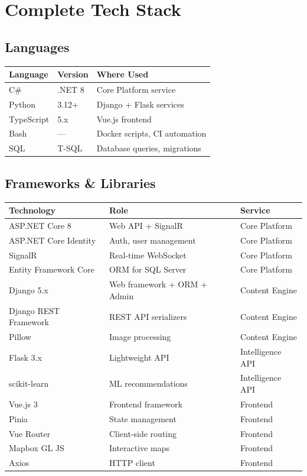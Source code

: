 \documentclass[12pt,letterpaper]{article}
\begin{document}
\newpage

\section{Complete Tech Stack}

\subsection{Languages}
\begin{tabular}{|l|l|l|}
\hline
\textbf{Language} & \textbf{Version} & \textbf{Where Used} \\
\hline
C\# & .NET 8 & Core Platform service \\
Python & 3.12+ & Django + Flask services \\
TypeScript & 5.x & Vue.js frontend \\
Bash & --- & Docker scripts, CI automation \\
SQL & T-SQL & Database queries, migrations \\
\hline
\end{tabular}

\subsection{Frameworks \& Libraries}
\begin{tabular}{|l|l|l|}
\hline
\textbf{Technology} & \textbf{Role} & \textbf{Service} \\
\hline
ASP.NET Core 8 & Web API + SignalR & Core Platform \\
ASP.NET Core Identity & Auth, user management & Core Platform \\
SignalR & Real-time WebSocket & Core Platform \\
Entity Framework Core & ORM for SQL Server & Core Platform \\
Django 5.x & Web framework + ORM + Admin & Content Engine \\
Django REST Framework & REST API serializers & Content Engine \\
Pillow & Image processing & Content Engine \\
Flask 3.x & Lightweight API & Intelligence API \\
scikit-learn & ML recommendations & Intelligence API \\
Vue.js 3 & Frontend framework & Frontend \\
Pinia & State management & Frontend \\
Vue Router & Client-side routing & Frontend \\
Mapbox GL JS & Interactive maps & Frontend \\
Axios & HTTP client & Frontend \\
\hline
\end{tabular}
\end{document}
